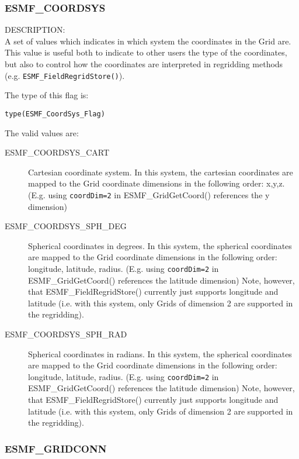 
\subsubsection{ESMF\_COORDSYS}
\label{const:coordsys}

{\sf DESCRIPTION:\\}
 A set of values which indicates in which system the coordinates in the Grid are. This value is useful both to indicate to 
other users the type of the coordinates, but also to control how the coordinates are interpreted in regridding methods 
(e.g. {\tt ESMF\_FieldRegridStore()}).

The type of this flag is:

{\tt type(ESMF\_CoordSys\_Flag)}

The valid values are:
\begin{description}
\item [ESMF\_COORDSYS\_CART] Cartesian coordinate system. In this system, the cartesian coordinates are mapped to the Grid coordinate dimensions in the following order: x,y,z. (E.g. using {\tt coordDim=2} in ESMF\_GridGetCoord() references the y dimension) 

\item [ESMF\_COORDSYS\_SPH\_DEG] Spherical coordinates in degrees. In this system, the spherical coordinates are mapped to the Grid coordinate dimensions in the following order: longitude, latitude, radius. (E.g. using {\tt coordDim=2} in ESMF\_GridGetCoord() references the latitude dimension) Note, however, that ESMF\_FieldRegridStore() currently just supports longitude and latitude (i.e. with this system, only Grids of dimension 2 are supported in the regridding).

\item [ESMF\_COORDSYS\_SPH\_RAD] Spherical coordinates in radians. In this system, the spherical coordinates are mapped to the Grid coordinate dimensions in the following order: longitude, latitude, radius. (E.g. using {\tt coordDim=2} in ESMF\_GridGetCoord() references the latitude dimension) Note, however, that ESMF\_FieldRegridStore() currently just supports longitude and latitude (i.e. with this system, only Grids of dimension 2 are supported in the regridding).

\end{description}


\subsubsection{ESMF\_GRIDCONN}
\label{const:gridconn}


